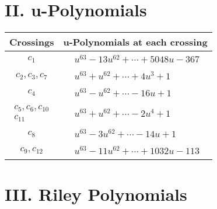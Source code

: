 \documentclass[1p]{elsarticle_modified}
\theoremstyle{definition}
\begin{document}
\newpage\renewcommand{\arraystretch}{1}
\centering \section*{ II. u-Polynomials}
\begin{tabular}{m{50pt}|m{274pt}}
Crossings & \hspace{64pt}u-Polynomials at each crossing \\
\hline $$\begin{aligned}c_{1}\end{aligned}$$&$\begin{aligned}
&u^{63}-13 u^{62}+\cdots+5048 u-367
\end{aligned}$\\
\hline $$\begin{aligned}c_{2},c_{3},c_{7}\end{aligned}$$&$\begin{aligned}
&u^{63}+u^{62}+\cdots+4 u^3+1
\end{aligned}$\\
\hline $$\begin{aligned}c_{4}\end{aligned}$$&$\begin{aligned}
&u^{63}- u^{62}+\cdots-16 u+1
\end{aligned}$\\
\hline $$\begin{aligned}c_{5},c_{6},c_{10}\\c_{11}\end{aligned}$$&$\begin{aligned}
&u^{63}+u^{62}+\cdots-2 u^4+1
\end{aligned}$\\
\hline $$\begin{aligned}c_{8}\end{aligned}$$&$\begin{aligned}
&u^{63}-3 u^{62}+\cdots-14 u+1
\end{aligned}$\\
\hline $$\begin{aligned}c_{9},c_{12}\end{aligned}$$&$\begin{aligned}
&u^{63}-11 u^{62}+\cdots+1032 u-113
\end{aligned}$\\
\hline
\end{tabular}\newpage\renewcommand{\arraystretch}{1}
\centering \section*{ III. Riley Polynomials}
\end{document}
